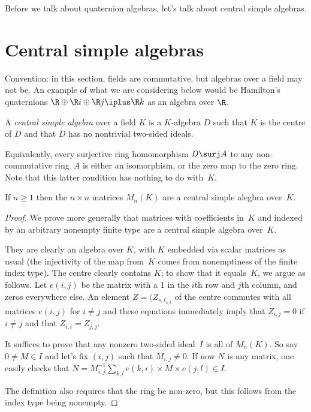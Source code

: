 Before we talk about quaternion algebras, let's talk about central simple algebras.

\section{Central simple algebras}

Convention: in this section, fields are commutative, but algebras over a field may not be. An example
of what we are considering below would be Hamilton's quaternions $\R\oplus\R i\oplus\R j\iplus\R k$ as an algebra over $\R$.


\begin{definition}
    \label{IsCentralSimple}
    \leanOK
A \emph{central simple algebra} over a field $K$ is a $K$-algebra $D$ such that $K$ is the centre of $D$
and that $D$ has no nontrivial two-sided ideals.
\end{definition}

Equivalently, every surjective ring homomorphism $D\surj A$ to any non-commutative ring~$A$
is either an isomorphism, or the zero map to the zero ring. Note that this latter condition has nothing
to do with~$K$.

\begin{lemma}
    \label{MatrixRing.IsCentralSimple}
    If $n\geq1$ then the $n\times n$ matrices $M_n(K)$ are a central simple alegbra over~$K$.
\end{lemma}
\begin{proof}
We prove more generally that matrices with coefficients in~$K$ and indexed by an arbitrary nonempty 
finite type are a central simple algebra over~$K$.

They are clearly an algebra over $K$, with $K$ embedded via scalar matrices as usual
(the injectivity of the map from~$K$ comes from nonemptiness of the finite index type). 
The centre clearly contains $K$; to show that it
equals~$K$, we argue as follows. Let $e(i,j)$ be the matrix with a 1 in the $i$th row and $j$th
column, and zeros everywhere else. An element $Z=(Z_{s,t}_{s,t}$ of the centre commutes with 
all matrices $e(i,j)$ for $i\not=j$ and these equations immediately imply that $Z_{i,j}=0$ if $i\not=j$
and that $Z_{i,i}=Z_{j,j}$.

It suffices to prove that any nonzero two-sided ideal~$I$ is all of $M_n(K)$. So say $0\not=M\in I$
and let's fix $(i,j)$ such that $M_{i,j}\not=0$. If now $N$ is any matrix, one easily checks
that $N=M_{i,j}^{-1}\sum_{k,l}e(k,i)\times M\times e(j,l)\in I$.

The definition also requires that the ring be non-zero, but this follows from the index type being nonempty.
\end{proof}

